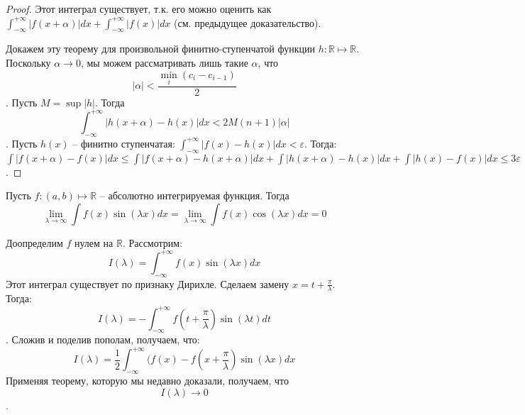 \documentclass[document.tex]{subfiles}
\begin{document}
\begin{proof}
Этот интеграл существует, т.к. его можно оценить как $\int_{-\infty}^{+\infty}|f(x+\alpha)|dx + \int_{-\infty}^{+\infty}|f(x)|dx$ (см. предыдущее доказательство).

Докажем эту теорему для произвольной финитно-ступенчатой функции $h: \mathbb{R} \mapsto \mathbb{R}$. Поскольку $\alpha \rightarrow 0$, мы можем рассматривать лишь такие $\alpha$, что $$|\alpha| < \frac{\min_i (c_i - c_{i-1})}{2}$$. Пусть $M = \sup |h|$. Тогда 
$$\int_{-\infty}^{+\infty} |h(x + \alpha) - h(x)|dx < 2M(n+1)|\alpha|$$. Пусть $h(x)$ -- финитно ступенчатая: $\int_{-\infty}^{+\infty}|f(x) - h(x)|dx < \varepsilon$. Тогда:
$\int |f(x+\alpha) - f(x)|dx \leq \int|f(x+\alpha)-h(x+\alpha)|dx + \int|h(x+\alpha)-h(x)|dx + \int|h(x)-f(x)|dx \leq 3\varepsilon$.
\end{proof}

\begin{Lemma}
Пусть $f : (a, b) \mapsto \mathbb{R}$ -- абсолютно интегрируемая функция. Тогда 
$$\lim_{\lambda \rightarrow \infty} \int f(x)\sin (\lambda x)dx = \lim_{\lambda \rightarrow \infty} \int f(x)\cos (\lambda x)dx = 0$$
\end{Lemma}
\begin{Proof}
Доопределим $f$ нулем на $\mathbb{R}$. Рассмотрим:
$$I(\lambda) = \int_{-\infty}^{+\infty}f(x)\sin(\lambda x)dx$$
Этот интеграл существует по признаку Дирихле. Сделаем замену $x = t + \frac{\pi}{\lambda}$.
Тогда:
$$I(\lambda) = -\int_{-\infty}^{+\infty}f(t + \frac{\pi}{\lambda})\sin(\lambda t)dt$$.
Сложив и поделив пополам, получаем, что:
$$I(\lambda) = \frac{1}{2} \int_{-\infty}^{+\infty}(f(x) - f(x+\frac{\pi}{\lambda})\sin(\lambda x)dx$$
Применяя теорему, которую мы недавно доказали, получаем, что $$I(\lambda) \rightarrow 0$$.
\end{Proof}
\end{document}
